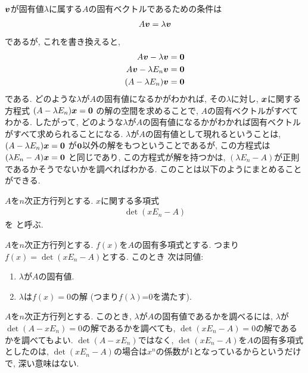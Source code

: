 $\boldsymbol{v}$が固有値$\lambda$に属する$A$の固有ベクトルであるための条件は
\begin{align*}
  A\boldsymbol{v}=\lambda\boldsymbol{v}
\end{align*}
であるが,
これを書き換えると,
\begin{align*}
  A\boldsymbol{v}-\lambda\boldsymbol{v}&=\boldsymbol{0}\\
  A\boldsymbol{v}-\lambda E_n \boldsymbol{v}&=\boldsymbol{0}\\
  (A-\lambda E_n) \boldsymbol{v}&=\boldsymbol{0}
\end{align*}
である.
どのような$\lambda$が$A$の固有値になるかがわかれば,
その$\lambda$に対し,
$\boldsymbol{x}$に関する方程式
$(A-\lambda E_n) \boldsymbol{x}=\boldsymbol{0}$
の解の空間を求めることで,
$A$の固有ベクトルがすべてわかる.
したがって,
どのような$\lambda$が$A$の固有値になるかがわかれば固有ベクトルがすべて求められることになる.
$\lambda$が$A$の固有値として現れるということは,
$(A-\lambda E_n) \boldsymbol{x}=\boldsymbol{0}$
が$\boldsymbol{0}$以外の解をもつということであるが,
この方程式は
$(\lambda E_n-A) \boldsymbol{x}=\boldsymbol{0}$
と同じであり, 
この方程式が解を持つかは, $(\lambda E_n-A)$が正則であるかそうでないかを調べればわかる.
このことは以下のようにまとめることができる.
\begin{definition}
  \label{def:charpoly}
  $A$を$n$次正方行列とする.
  $x$に関する多項式
  \begin{align*}
  \det(xE_n-A)
  \end{align*}
  を
  と呼ぶ.
\end{definition}
\begin{prop}
  $A$を$n$次正方行列とする.
  $f(x)$を$A$の固有多項式とする.
  つまり $f(x)=\det(xE_n-A)$とする.
  このとき 次は同値:
  \begin{enumerate}
  \item $\lambda$が$A$の固有値.
  \item $\lambda$は$f(x)=0$の解 (つまり$f(\lambda)$=0を満たす).
  \end{enumerate}
\end{prop}
\begin{remark}
  $A$を$n$次正方行列とする.
  このとき, $\lambda$が$A$の固有値であるかを調べるには,
  $\lambda$が
  $\det(A-xE_n)=0$の解であるかを調べても,
  $\det(xE_n-A)=0$の解であるかを調べてもよい.
  $\det(A-xE_n)$ではなく,
  $\det(xE_n-A)$を$A$の固有多項式としたのは,
  $\det(xE_n-A)$の場合は$x^n$の係数が$1$となっているからというだけで,
  深い意味はない.
\end{remark}

